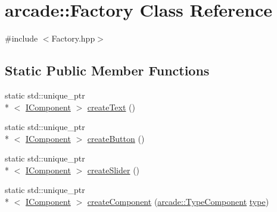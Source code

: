\hypertarget{classarcade_1_1_factory}{\section{arcade\-:\-:Factory Class Reference}
\label{classarcade_1_1_factory}
}


{\ttfamily \#include $<$Factory.\-hpp$>$}

\subsection*{Static Public Member Functions}
\begin{DoxyCompactItemize}
\item 
static std\-::unique\-\_\-ptr\\*
$<$ \hyperlink{classarcade_1_1_i_component}{I\-Component} $>$ \hyperlink{classarcade_1_1_factory_a39ff09929cf1724c80014f6f80510069}{create\-Text} ()
\item 
static std\-::unique\-\_\-ptr\\*
$<$ \hyperlink{classarcade_1_1_i_component}{I\-Component} $>$ \hyperlink{classarcade_1_1_factory_a44fc20806dad20779b0df7048363885f}{create\-Button} ()
\item 
static std\-::unique\-\_\-ptr\\*
$<$ \hyperlink{classarcade_1_1_i_component}{I\-Component} $>$ \hyperlink{classarcade_1_1_factory_a71cb5a03de765ee041ad27ab75b9ed82}{create\-Slider} ()
\item 
static std\-::unique\-\_\-ptr\\*
$<$ \hyperlink{classarcade_1_1_i_component}{I\-Component} $>$ \hyperlink{classarcade_1_1_factory_acc243d58e2c5d8506e2b3d8e13cbb151}{create\-Component} (\hyperlink{namespacearcade_aa1f24da3b3cc32ae8c1b3f36c3c59b21}{arcade\-::\-Type\-Component} \hyperlink{_entity_8cpp_aa209819775142a76b8e49319d79ecab2}{type})
\end{DoxyCompactItemize}


